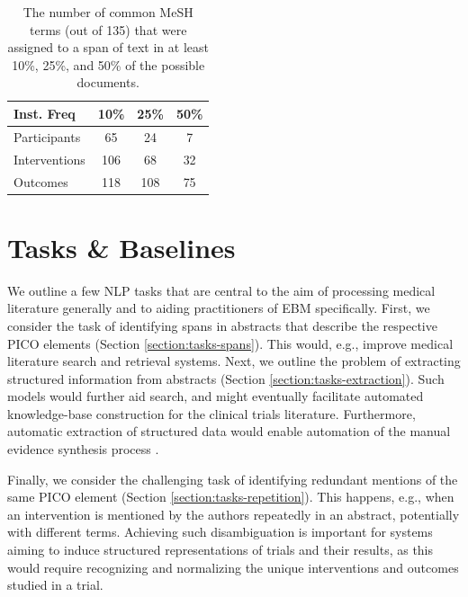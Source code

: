 \documentclass[11pt,a4paper]{article}
\begin{document}
\begin{table}%
\small %
    \centering
    \begin{tabular}{ l c c c} 
    	\hline
        Inst. Freq & 10\% & 25\% & 50\% \\
        \hline
        Participants & 65 & 24 & 7 \\
        Interventions & 106 & 68 & 32 \\
        Outcomes & 118 & 108 & 75 \\
        \hline
    \end{tabular}
    \caption{The number of common MeSH terms (out of 135) that were assigned to a span of text in at least 10\%, 25\%, and 50\% of the possible documents. } %
    	\label{table:mesh_rates}
\end{table}

\section{Tasks \& Baselines}
\label{section:tasks-baselines}

We outline a few NLP tasks that are central to the aim of processing medical literature generally and to aiding practitioners of EBM specifically. First, we consider the task of identifying spans in abstracts that describe the respective PICO elements (Section \ref{section:tasks-spans}). This would, e.g., improve medical literature search and retrieval systems. Next, we outline the problem of extracting structured information from abstracts (Section \ref{section:tasks-extraction}). Such models would further aid search, and might eventually facilitate automated knowledge-base construction for the clinical trials literature. Furthermore, automatic extraction of structured data would enable automation of the manual evidence synthesis process \cite{marshall:2017:ACL}.

Finally, we consider the challenging task of identifying redundant mentions of the same PICO element (Section \ref{section:tasks-repetition}). This happens, e.g., when an intervention is mentioned by the authors repeatedly in an abstract, potentially with different terms. Achieving such disambiguation is important for systems aiming to induce structured representations of trials and their results, as this would require recognizing and normalizing the unique interventions and outcomes studied in a trial.  
\end{document}
